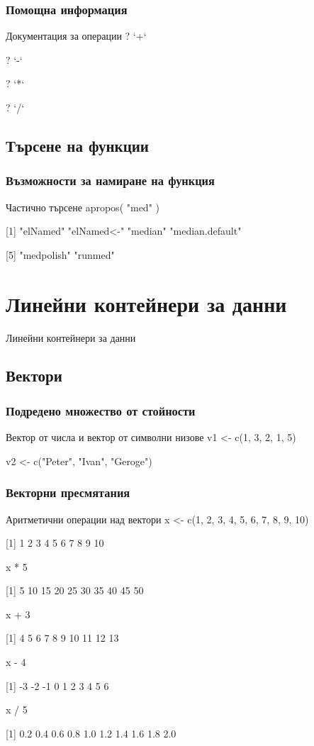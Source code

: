 \documentclass{beamer}
\begin{document}
\begin{frame}
\frametitle{Помощна информация}
\begin{block}{Документация за операции}
? `+`

? `-`

? `*`

? `/`
\end{block}
\end{frame}

\subsection{Търсене на функции}

\begin{frame}
\frametitle{Възможности за намиране на функция}
\begin{block}{Частично търсене}
apropos( "med" )

[1] "elNamed"        "elNamed<-"      "median"         "median.default"

[5] "medpolish"      "runmed"
\end{block}
\end{frame}

\section{Линейни контейнери за данни}

\begin{frame}
\center \huge{Линейни контейнери за данни}
\end{frame}

\subsection{Вектори}

\begin{frame}
\frametitle{Подредено множество от стойности}
\begin{block}{Вектор от числа и вектор от символни низове}
v1 <- c(1, 3, 2, 1, 5)

v2 <- c("Peter", "Ivan", "Geroge")
\end{block}
\end{frame}

\begin{frame}
\frametitle{Векторни пресмятания}
\begin{block}{Аритметични операции над вектори}
x <- c(1, 2, 3, 4, 5, 6, 7, 8, 9, 10)

[1]  1  2  3  4  5  6  7  8  9 10

x * 5

[1]  5 10 15 20 25 30 35 40 45 50

x + 3

[1]  4  5  6  7  8  9 10 11 12 13

x - 4

[1] -3 -2 -1  0  1  2  3  4  5  6

x / 5

[1] 0.2 0.4 0.6 0.8 1.0 1.2 1.4 1.6 1.8 2.0
\end{block}
\end{frame}
\end{document}
